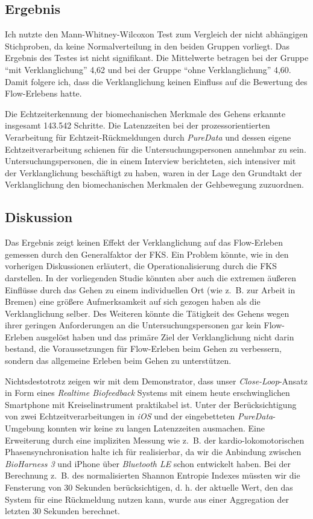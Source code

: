 \subsection{Ergebnis}
Ich nutzte den Mann-Whitney-Wilcoxon Test zum Vergleich der nicht abhängigen Stichproben, da keine Normalverteilung in den beiden Gruppen vorliegt. Das Ergebnis des Testes ist nicht signifikant. Die Mittelwerte betragen bei der Gruppe "`mit Verklanglichung"' 4,62 und bei der Gruppe "`ohne Verklanglichung"' 4,60. Damit folgere ich, dass die Verklanglichung keinen Einfluss auf die Bewertung des Flow-Erlebens hatte. 

Die Echtzeiterkennung der biomechanischen Merkmale des Gehens erkannte insgesamt 143.542 Schritte. Die Latenzzeiten bei der prozessorientierten Verarbeitung für Echtzeit-Rückmeldungen durch \emph{PureData} und dessen eigene Echtzeitverarbeitung schienen für die Untersuchungspersonen annehmbar zu sein. Untersuchungspersonen, die in einem Interview berichteten, sich intensiver mit der Verklanglichung beschäftigt zu haben, waren in der Lage den Grundtakt der Verklanglichung den biomechanischen Merkmalen der Gehbewegung zuzuordnen.

\subsection{Diskussion} 
Das Ergebnis zeigt keinen Effekt der Verklanglichung auf das Flow-Erleben gemessen durch den Generalfaktor der \ac{FKS}. Ein Problem könnte, wie in den vorherigen Diskussionen erläutert, die Operationalisierung durch die \ac{FKS} darstellen. In der vorliegenden Studie könnten aber auch die extremen äußeren Einflüsse durch das Gehen zu einem individuellen Ort (wie z.~B. zur Arbeit in Bremen) eine größere Aufmerksamkeit auf sich gezogen haben als die Verklanglichung selber. Des Weiteren könnte die Tätigkeit des Gehens wegen ihrer geringen Anforderungen an die Untersuchungspersonen gar kein Flow-Erleben ausgelöst haben und das primäre Ziel der Verklanglichung nicht darin bestand, die Voraussetzungen für Flow-Erleben beim Gehen zu verbessern, sondern das allgemeine Erleben beim Gehen zu unterstützen. 

Nichtsdestotrotz zeigen wir mit dem Demonstrator, dass unser \emph{Close-Loop}-Ansatz in Form eines \emph{Realtime Biofeedback} Systems mit einem heute erschwinglichen Smartphone mit Kreiselinstrument praktikabel ist. Unter der Berücksichtigung von zwei Echtzeitverarbeitungen in \emph{iOS} und der eingebetteten \emph{PureData}-Umgebung konnten wir keine zu langen Latenzzeiten ausmachen. Eine Erweiterung durch eine impliziten Messung wie z.~B. der kardio-lokomotorischen Phasensynchronisation halte ich für realisierbar, da wir die Anbindung zwischen \emph{BioHarness 3} und iPhone über \emph{Bluetooth LE} schon entwickelt haben. Bei der Berechnung z.~B. des normalisierten Shannon Entropie Indexes müssten wir die Fensterung von 30 Sekunden berücksichtigen, d. h. der aktuelle Wert, den das System für eine Rückmeldung nutzen kann, wurde aus einer Aggregation der letzten 30 Sekunden berechnet. 

